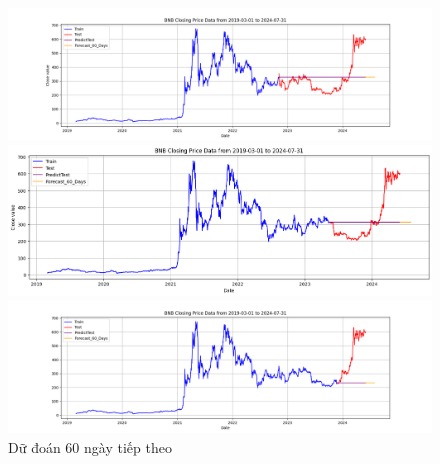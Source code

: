 \documentclass[conference]{IEEEtran}
\begin{document}
	\begin{figure}[H]
		\centering
		\begin{minipage}{0.15\textwidth}
			\centering
			\includegraphics[width=1\textwidth]{Figure/ARIMA_BNB_60days_73.png}
		\end{minipage}
		\hfill
		\begin{minipage}{0.15\textwidth}
			\centering
			\includegraphics[width=1\textwidth]{Figure/ARIMA_BNB_60days_82.png}
		\end{minipage}
		\hfill
		\begin{minipage}{0.15\textwidth}
			\centering
			\includegraphics[width=1\textwidth]{Figure/ARIMA_BNB_60days_91.png}
		\end{minipage}
		\caption{Dữ đoán 60 ngày tiếp theo}
		\label{fig:1}
	\end{figure}
	
\end{document}
